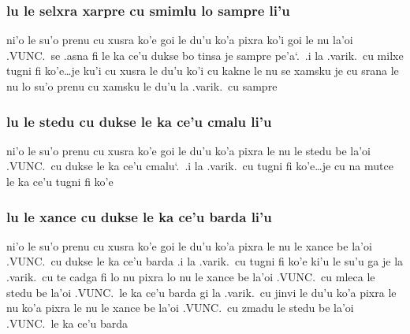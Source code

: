 \documentclass{report}
\newcommand\sds{\spacefactor\sfcode`.\ \space}
\begin{document}
\subsubsection{lu le selxra xarpre cu smimlu lo sampre li'u}
ni'o le su'o prenu cu xusra ko'e goi le du'u ko'a pixra ko'i goi le nu la'oi .VUNC.\ se .asna fi le ka ce'u dukse bo tinsa je sampre pe'a\sds  .i la .varik.\ cu milxe tugni fi ko'e\ldots je ku'i cu xusra le du'u ko'i cu kakne le nu se xamsku je cu srana le nu lo su'o prenu cu xamsku le du'u la .varik.\ cu sampre

\subsubsection{lu le stedu cu dukse le ka ce'u cmalu li'u}
ni'o le su'o prenu cu xusra ko'e goi le du'u ko'a pixra le nu le stedu be la'oi .VUNC.\ cu dukse le ka ce'u cmalu\sds  .i la .varik.\ cu tugni fi ko'e\ldots je cu na mutce le ka ce'u tugni fi ko'e

\subsubsection{lu le xance cu dukse le ka ce'u barda li'u}
ni'o le su'o prenu cu xusra ko'e goi le du'u ko'a pixra le nu le xance be la'oi .VUNC.\ cu dukse le ka ce'u barda  .i la .varik.\ cu tugni fi ko'e ki'u le su'u ga je la .varik.\ cu te cadga fi lo nu pixra lo nu le xance be la'oi .VUNC.\ cu mleca le stedu be la'oi .VUNC.\ le ka ce'u barda gi la .varik.\ cu jinvi le du'u ko'a pixra le nu ko'a pixra le nu le xance be la'oi .VUNC.\ cu zmadu le stedu be la'oi .VUNC.\ le ka ce'u barda
\end{document}
